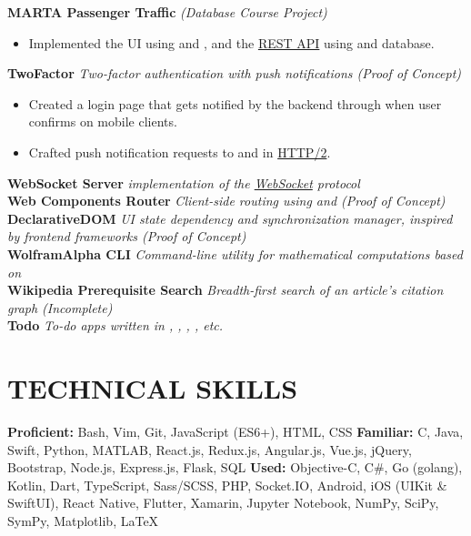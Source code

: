 \documentclass[11pt]{article}
\begin{document}
\vspace{0.5em}
%
\textbf{MARTA Passenger Traffic} \enspace \textit{(Database Course Project)}
\begin{itemize}[leftmargin=15pt, noitemsep, topsep=0pt]
\item Implemented the UI using \underline{} and \underline{}, and the \underline{REST API} using \underline{} and \underline{} database.
\end{itemize}
\vspace{0.5em}
%
\textbf{TwoFactor} \enspace \textit{Two-factor authentication with push notifications (Proof of Concept)}
\begin{itemize}[leftmargin=15pt, noitemsep, topsep=0pt]
\item Created a login page that gets notified by the \underline{} backend through \underline{} when user confirms on mobile clients.
\item Crafted push notification requests to \underline{} and \underline{} in \underline{HTTP/2}.
\end{itemize}
\vspace{0.5em}
%
\textbf{WebSocket Server}  \enspace \textit{\underline{} implementation of  the \underline{WebSocket} protocol}\\
\textbf{Web Components Router} \enspace \textit{Client-side routing using \underline{} and \underline{} (Proof of Concept)}\\
\textbf{DeclarativeDOM} \enspace \textit{UI state dependency and synchronization manager, inspired by frontend frameworks (Proof of Concept)}\\
\textbf{WolframAlpha CLI} \enspace \textit{Command-line utility for mathematical computations based on \underline{}}\\
\textbf{Wikipedia Prerequisite Search} \enspace \textit{Breadth-first search of an article's citation graph (Incomplete)}\\
\textbf{Todo} \enspace \textit{To-do apps written in \underline{}, \underline{}, \underline{}, \underline{}, etc.}
\vspace{-0.5em}

\section*{TECHNICAL SKILLS}
\textbf{Proficient:} Bash, Vim, Git, JavaScript (ES6+), HTML, CSS  \enspace\textbf{Familiar:} C, Java, Swift, Python, MATLAB, React.js, Redux.js, Angular.js, Vue.js, jQuery, Bootstrap, Node.js, Express.js, Flask, SQL  \enspace\textbf{Used:} Objective-C, C\#, Go (golang), Kotlin, Dart, TypeScript, Sass/SCSS, PHP, Socket.IO, Android, iOS (UIKit \& SwiftUI), React Native, Flutter, Xamarin, Jupyter Notebook, NumPy, SciPy, SymPy, Matplotlib, LaTeX
\end{document}
